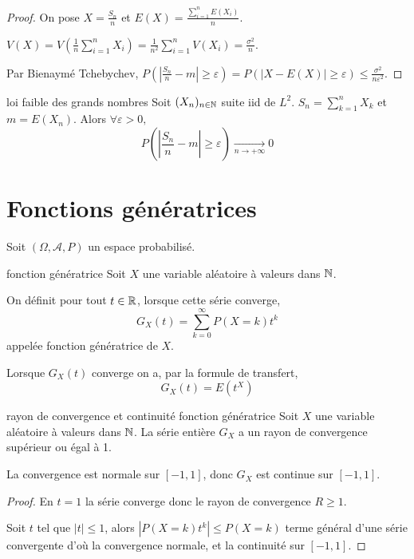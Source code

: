 \begin{proof}
    On pose $X = \frac{S_n}{n}$ et $\displaystyle E(X) = \frac{\sum_{i = 1 }^{n } E(X_i)} n$. 

    $\displaystyle V(X) = V\left( \frac 1 n \sum_{i = 1 }^{ n } X_i \right) = \frac 1 {n^2} \sum_{i = 1 }^{ n } V(X_i) = \frac{\sigma^2}{n}$.

    Par Bienaymé Tchebychev,
    $\displaystyle P\left( \left| \frac{S_n}{n} - m \right| \geqslant \varepsilon \right) = P(|X - E(X)| \geqslant \varepsilon) \leqslant \frac{\sigma^2}{n \varepsilon^2}$.
\end{proof}

\begin{proposition}{loi faible des grands nombres}{}
    Soit $(X_n)_{n \in \mathbb{N}}$ suite iid de $L^2$. 
    $\displaystyle S_n = \sum_{k = 1 }^{ n } X_k$ et $m = E(X_n)$. Alors 
    $\forall \varepsilon > 0,$  $$P\left( \left| \frac{S_n}{n} - m \right| \geqslant \varepsilon \right) \xrightarrow[n \to + \infty]{} 0$$
\end{proposition}

\section{Fonctions génératrices }

Soit $(\Omega, \mathcal A, P)$ un espace probabilisé. 

\begin{definition}{fonction génératrice}{}
    Soit $X$ une variable aléatoire à valeurs dans $\mathbb{N}$.

    On définit pour tout $t \in \mathbb{R}$, lorsque cette série converge, 
    $$ G_X(t) = \sum_{k = 0 }^{\infty } P(X = k) t^k $$
    appelée fonction génératrice de $X$.

    Lorsque $G_X(t)$ converge on a, par la formule de transfert,
    $$ G_X(t) = E(t^X) $$
\end{definition}

\begin{theoreme}{rayon de convergence et continuité fonction génératrice}{}
    Soit $X$ une variable aléatoire à valeurs dans $\mathbb{N}$. La série entière 
    $G_X$ a un rayon de convergence supérieur ou égal à 1. 

    La convergence est normale sur $[-1, 1]$, donc $G_X$ est continue sur $[-1, 1]$.
\end{theoreme}

\begin{proof}
    En $t = 1$ la série converge donc le rayon de convergence $R \geqslant 1$.

    Soit $t $ tel que $|t| \leqslant 1$, alors 
    $|P(X = k) t^k| \leqslant P(X = k)$ terme général d'une série convergente d'où la 
    convergence normale, et la continuité sur $[-1, 1]$.
\end{proof}

